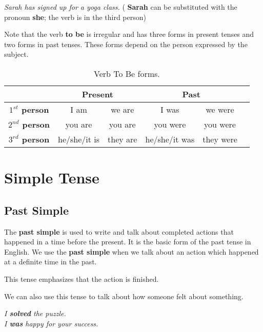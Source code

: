 \documentclass[hidelinks,10pt,a4paper]{article}
\begin{document}
\begin{center}
	\textit{Sarah has signed up for a yoga class.} ( \textbf{Sarah} can be substituted with the pronoun \textbf{she}; the verb is in the third person)
 \end{center}

Note that the verb \textbf{to be} is irregular and has three forms in present tenses and two forms in past tenses. These forms depend on the person expressed by the subject.

\begin{table}[h]
	\begin{center}
	\begin{tabular}{|c|c|c|c|c|c}
		\hline
		 & \multicolumn{2}{|c|}{ \textbf{Present}} & \multicolumn{2}{|c|}{ \textbf{Past}} \\ \hline
		\textbf{$1^{st}$ person} & I am & we are & I was & we were \\ \hline
		\textbf{$2^{nd}$ person} & you are & you are & you were & you were \\ \hline
		\textbf{$3^{rd}$ person} & he/she/it is & they are & he/she/it was & they were \\ \hline
	\end{tabular}
\end{center}
\caption{\label{tab:vrbcjg2}Verb To Be forms.}
\end{table}

\section{Simple Tense}
\subsection{Past Simple}
The \textbf{past simple} is used to write and talk about completed actions that happened in a time before the present. It is the basic form of the past tense in English. We use the \textbf{past simple} when we talk about an action which happened at a definite time in the past.

This tense emphasizes that the action is finished.

We can also use this tense to talk about how someone felt about something.

\begin{center}
	\textit{I \textbf{solved} the puzzle. \\
	I \textbf{was} happy for your success.}
\end{center}
\end{document}
